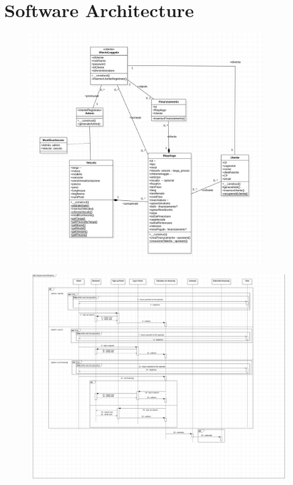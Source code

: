 \documentclass[12pt]{article}
\begin{document}
\section{Software Architecture}
\begin{figure}[ht]
  \includegraphics[width=0.90\textwidth]{ClassDiagram.jpeg}
\end{figure}
\pagebreak
\begin{figure}[ht]
  \includegraphics[width=1.20\textwidth]{Sequence.jpeg}
\end{figure}
\pagebreak  
\end{document}
